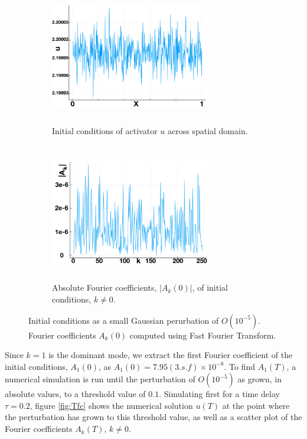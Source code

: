 \begin{figure}[H]
    \centering
    \begin{subfigure}[b]{0.45\textwidth}
        \centering
        \includegraphics[width=7cm,height=6cm]{uic.png}
        \caption{Initial conditions of activator $u$ across spatial domain.}
        \label{}
    \end{subfigure}
    \hfill
    \begin{subfigure}[b]{0.45\textwidth}
        \centering
        \includegraphics[width=7cm,height=6cm]{uicfc.png}
        \caption{Absolute Fourier coefficients, $|A_k(0)|$, of initial conditions, $k\neq0$.}
        \label{fig:}
    \end{subfigure}
    \caption{Initial conditions as a small Gaussian perurbation of $O(10^{-5})$. Fourier coefficients $A_k(0)$ computed using Fast Fourier Transform.}
    \label{fig:icfc}
\end{figure}
Since $k=1$ is the dominant mode, we extract the first Fourier coefficient of the initial conditions, $A_1(0)$, as $A_1(0)=7.95(3.s.f)\times10^{-8}$. To find $A_1(T)$, a numerical simulation is run until the perturbation of $O(10^{-5})$ as grown, in absolute values, to a threshold value of $0.1$. Simulating first for a time delay $\tau=0.2$, figure \ref{fig:Tfc} shows the numerical solution $u(T)$ at the point where the perturbation has grown to this threshold value, as well as a scatter plot of the Fourier coefficients $A_k(T)$, $k\neq0$.
